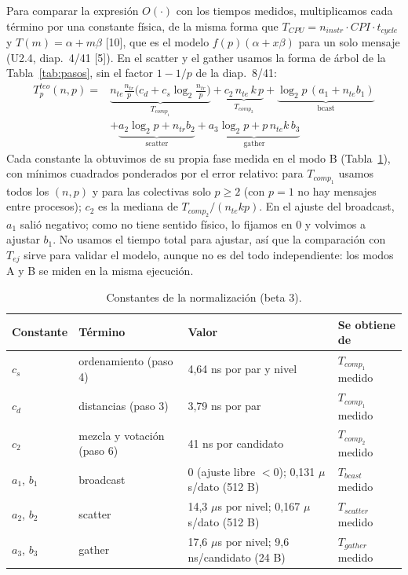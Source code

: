 \documentclass[11pt,a4paper]{article}
\newcommand{\ntr}{n_{tr}}
\newcommand{\nte}{n_{te}}
\begin{document}
Para comparar la expresión $O(\cdot)$ con los tiempos medidos, multiplicamos cada término por una constante física, de la misma forma que $T_{CPU} = n_{instr}\cdot CPI\cdot t_{cycle}$ y $T(m) = \alpha + m\beta$ [10], que es el modelo $f(p)(\alpha + x\beta)$ para un solo mensaje (U2.4, diap.~4/41 [5]). En el scatter y el gather usamos la forma de árbol de la Tabla~\ref{tab:pasos}, sin el factor $1-1/p$ de la diap.~8/41:
\begin{align*}
T_p^{teo}(n,p) = {}& \underbrace{\nte\frac{\ntr}{p}\Big(c_d + c_s\log_2\frac{\ntr}{p}\Big)}_{T_{comp_1}} + \underbrace{c_2\,\nte\,k\,p}_{T_{comp_2}} + \underbrace{\log_2 p\,(a_1 + \nte b_1)}_{\text{bcast}}\\
&+ \underbrace{a_2\log_2 p + \ntr b_2}_{\text{scatter}} + \underbrace{a_3\log_2 p + p\,\nte k\, b_3}_{\text{gather}}
\end{align*}
Cada constante la obtuvimos de su propia fase medida en el modo B (Tabla~\ref{tab:const}), con mínimos cuadrados ponderados por el error relativo: para $T_{comp_1}$ usamos todos los $(n,p)$ y para las colectivas solo $p \ge 2$ (con $p = 1$ no hay mensajes entre procesos); $c_2$ es la mediana de $T_{comp_2}/(\nte k p)$. En el ajuste del broadcast, $a_1$ salió negativo; como no tiene sentido físico, lo fijamos en 0 y volvimos a ajustar $b_1$. No usamos el tiempo total para ajustar, así que la comparación con $T_{ej}$ sirve para validar el modelo, aunque no es del todo independiente: los modos A y B se miden en la misma ejecución.

\begin{table}[!htb]
\centering
\small
\begin{tabular}{llll}
\toprule
\textbf{Constante} & \textbf{Término} & \textbf{Valor} & \textbf{Se obtiene de} \\
\midrule
$c_s$ & ordenamiento (paso 4) & 4,64 ns por par y nivel & $T_{comp_1}$ medido \\
$c_d$ & distancias (paso 3) & 3,79 ns por par & $T_{comp_1}$ medido \\
$c_2$ & mezcla y votación (paso 6) & 41 ns por candidato & $T_{comp_2}$ medido \\
$a_1$, $b_1$ & broadcast & 0 (ajuste libre $<0$); 0,131 $\mu$s/dato (512 B) & $T_{bcast}$ medido \\
$a_2$, $b_2$ & scatter & 14,3 $\mu$s por nivel; 0,167 $\mu$s/dato (512 B) & $T_{scatter}$ medido \\
$a_3$, $b_3$ & gather & 17,6 $\mu$s por nivel; 9,6 ns/candidato (24 B) & $T_{gather}$ medido \\
\bottomrule
\end{tabular}
\caption{Constantes de la normalización (beta 3).}
\label{tab:const}
\end{table}
\end{document}
